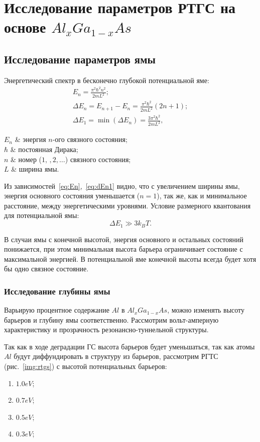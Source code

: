 \chapter{Исследование параметров РТГС на основе $Al_{x}Ga_{1-x}As$}
\section{Исследование параметров ямы}
Энергетический спектр в бесконечно глубокой потенциальной яме:
\begin{gather}
	\label{eq:En}
	E_{n} = \frac{\pi^{2}\hbar^{2}n^{2}}{2mL^{2}};\\
	\Delta E_{n} = E_{n+1} - E_{n} = \frac{\pi^{2}\hbar^{2}}{2mL^{2}}(2n + 1);\\
	\label{eq:dEn1}
	\Delta E_{1} = \min(\Delta E_{n}) = \frac{3\pi^{2}\hbar^{2}}{2mL^{2}},
\end{gather}
\begin{conditions}
	$E_{n}$ & энергия $n$-ого связного состояния;\\
	$\hbar$ & постоянная Дирака;\\
	$n$ & номер ($1,\,,2,\dots$) связного состояния;\\
	$L$ & ширина ямы.
\end{conditions}

Из зависимостей~\ref{eq:En},~\ref{eq:dEn1}  видно, что с увеличением ширины ямы, энергия основного состояния уменьшается ($n = 1$), так же, как и минимальное расстояние, между энергетическими уровнями. Условие размерного квантования для потенциальной ямы:
\begin{equation}
	\Delta E_{1} \gg 3k_{B}T.
\end{equation}

В случаи ямы с конечной высотой, энергия основного и остальных состояний понижается, при этом минимальная высота барьера ограничивает состояние с максимальной энергией. В потенциальной яме конечной высоты всегда будет хотя бы одно связное состояние.

\subsection{Исследование глубины ямы}
Варьирую процентное содержание $Al$ в $Al_{x}Ga_{1-x}As$, можно изменять высоту барьеров и глубину ямы соответственно. Рассмотрим вольт-амперную характеристику и прозрачность резонансно-туннельной структуры.

Так как в ходе деградации ГС высота барьеров будет уменьшаться, так как атомы $Al$ будут диффундировать в структуру из барьеров, рассмотрим РГТС (рис.~\ref{img:rtgs}) с высотой потенциальных барьеров:
\begin{enumerate}
	\item $1.0 eV$;
	\item $0.7 eV$;
	\item $0.5 eV$;
	\item $0.3 eV$;
\end{enumerate}


